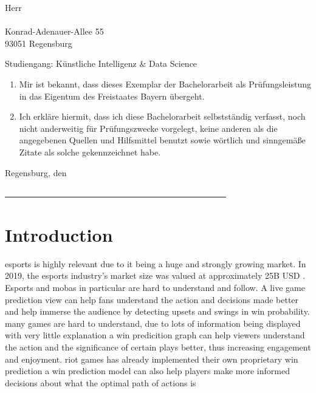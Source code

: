 \documentclass[12pt, a4paper, headinclude, twoside, plainheadsepline, open=right, numbers=noenddot, hidelinks, toc=listof, toc=bibliography]{scrreprt}
\begin{document}
\noindent
Herr\\
\@author\\
Konrad-Adenauer-Allee 55\\
93051 Regensburg\\
\smallskip

\noindent
Studiengang: Künstliche Intelligenz \& Data Science
\bigskip

\begin{enumerate}
\item Mir ist bekannt, dass dieses Exemplar der Bachelorarbeit als Prüfungsleistung in das Eigentum des Freistaates Bayern übergeht.
\item Ich erkläre hiermit, dass ich diese Bachelorarbeit selbstständig verfasst, noch nicht anderweitig für Prüfungszwecke vorgelegt, keine anderen als die angegebenen Quellen und Hilfsmittel benutzt sowie wörtlich und sinngemäße Zitate als solche gekennzeichnet habe.
\end{enumerate}
\vspace{1cm}
Regensburg, den \@date\\
\medskip
\medskip

\noindent
\underline{~~~~~~~~~~~~~~~~~~~~~~~~~~~~~~~~~~~~~~~~~~~~~~~~~~~~}\\
\@author

\makeatother



\cleardoublepage
{}\tableofcontents 										%




\pagestyle{scrheadings} 																%
\cleardoublepage
{} 																	%

\chapter{Introduction}
\label{chap:intro}


esports is highly relevant due to it being a huge and strongly growing market.
In 2019, the esports industry's market size was valued at approximately 25B USD \cite{ahnOneBillionDollar2020}.
Esports and mobas in particular are hard to understand and follow. A live game prediction view can help fans understand the action and decisions made better and help immerse the audience by detecting upsets and swings in win probability.
many games are hard to understand, due to lots of information being displayed with very little explanation
a win predicition graph can help viewers understand the action and the significance of certain plays better, thus increasing engagement and enjoyment.
riot games has already implemented their own proprietary win prediction
a win prediction model can also help players make more informed decisions about what the optimal path of actions is
\end{document}

